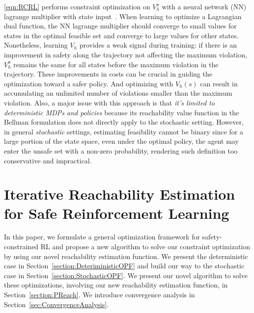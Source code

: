 \documentclass{article}
\theoremstyle{definition}
\begin{document}
\ref{eqn:RCRL} performs constraint optimization on $V^\pi_h$ with a neural network (NN) lagrange multiplier with state input~\cite{ma2021feasible}. When learning to optimize a Lagrangian dual function, the NN lagrange multiplier should converge to small values for states in the optimal feasible set and converge to large values for other states. Nonetheless, learning $V_h$ provides a weak signal during training: if there is an improvement in safety along the trajectory not affecting the maximum violation, $V^\pi_h$ remains the same for all states before the maximum violation in the trajectory. These improvements in costs can be crucial in guiding the optimization toward a safer policy. And optimizing with $V_h(s)$ can result in accumulating an unlimited number of violations smaller than the maximum violation. Also, a major issue with this approach is that \emph{it's limited to deterministic MDPs and policies} because its reachability value function in the Bellman formulation does not directly apply to the stochastic setting. However, in general {\em{stochastic}} settings, estimating feasibility cannot be binary since for a large portion of the state space, even under the optimal policy, the agent may enter the unsafe set with a non-zero probability, rendering such definition too conservative and impractical. 

\vspace{-5pt}
\section{Iterative Reachability Estimation for Safe Reinforcement Learning}
In this paper, we formulate a general optimization framework for safety-constrained RL and propose a new algorithm to solve our constraint optimization by using our novel reachability estimation function. We present the deterministic case in Section~\ref{section:DeteriministicOPF} and build our way to the stochastic case in Section~\ref{section:StochasticOPF}. We present our novel algorithm to solve these optimizations, involving our new reachability estimation function, in Section~\ref{section:PReach}. We introduce convergence analysis in Section~\ref{sec:ConvergenceAnalysis}.






\vspace{-5pt}
\end{document}
